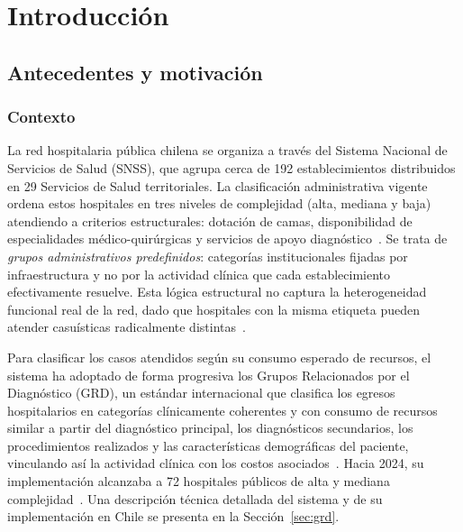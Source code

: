 \chapter{Introducción}
\label{cap:introduccion}
\section{Antecedentes y motivación}
\label{sec:antecedentes}

\subsection{Contexto}
\label{sec:contexto}

La red hospitalaria pública chilena se organiza a través del Sistema Nacional de
Servicios de Salud (SNSS), que agrupa cerca de 192 establecimientos distribuidos
en 29 Servicios de Salud territoriales. La clasificación administrativa vigente
ordena estos hospitales en tres niveles de complejidad (alta, mediana y baja)
atendiendo a criterios estructurales: dotación de camas, disponibilidad de
especialidades médico-quirúrgicas y servicios de apoyo diagnóstico~\citep{Cid2024}.
Se trata de \emph{grupos administrativos predefinidos}: categorías
institucionales fijadas por infraestructura y no por la actividad clínica que
cada establecimiento efectivamente resuelve. Esta lógica estructural no captura
la heterogeneidad funcional real de la red, dado que hospitales con la misma
etiqueta pueden atender casuísticas radicalmente
distintas~\citep{Havranek2023, Cid2024}.

Para clasificar los casos atendidos según su consumo esperado de recursos, el
sistema ha adoptado de forma
progresiva los Grupos Relacionados por el Diagnóstico (GRD), un estándar
internacional que clasifica los egresos hospitalarios en categorías
clínicamente coherentes y con consumo de recursos similar a partir del
diagnóstico principal, los diagnósticos secundarios, los procedimientos
realizados y las características demográficas del paciente, vinculando así la
actividad clínica con los costos asociados~\citep{Cid2024}. Hacia 2024, su
implementación alcanzaba a 72 hospitales públicos de alta y mediana
complejidad~\citep{Cid2024}. Una descripción técnica detallada del sistema y de
su implementación en Chile se presenta en la Sección~\ref{sec:grd}.

